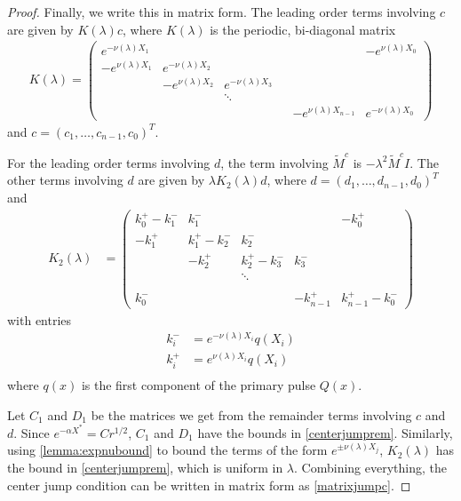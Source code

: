 \documentclass[thesis.tex]{subfiles}
\begin{document}
\begin{lemma}
\begin{proof}
Finally, we write this in matrix form. The leading order terms involving $c$ are given by $K(\lambda)c$, where $K(\lambda)$ is the periodic, bi-diagonal matrix
\begin{align*}
K(\lambda) =  
\begin{pmatrix}
e^{-\nu(\lambda)X_1} & & & & & -e^{\nu(\lambda)X_0} \\
-e^{\nu(\lambda)X_1} & e^{-\nu(\lambda)X_2} \\
& -e^{\nu(\lambda)X_2} & e^{-\nu(\lambda)X_3} \\
  & & \ddots & && \\
& & & & -e^{\nu(\lambda)X_{n-1}} & e^{-\nu(\lambda)X_0}
\end{pmatrix}
\end{align*}
and $c = (c_1, \dots, c_{n-1}, c_0)^T$.

For the leading order terms involving $d$, the term involving $\tilde{M}^c$ is $-\lambda^2 \tilde{M}^c I$. The other terms involving $d$ are given by $\lambda K_2(\lambda) d$, where $d = (d_1, \dots, d_{n-1}, d_0)^T$ and 
\begin{align*}
K_2(\lambda) &= \begin{pmatrix}
k_0^+ - k_1^- & k_1^- &&& -k_0^+ \\
-k_1^+ & k_1^+ - k_2^- & k_2^- \\
& -k_2^+ & k_2^+ - k_3^- & k_3^- \\ && \ddots \\
\\
k_0^- &&& -k_{n-1}^+ & k_{n-1}^+ - k_0^- 
\end{pmatrix}
\end{align*}
with entries
\begin{align*}
k_i^- &= e^{-\nu(\lambda)X_i} q(X_i)\\
k_i^+ &= e^{\nu(\lambda)X_i} q(X_i)\\
\end{align*}
where $q(x)$ is the first component of the primary pulse $Q(x)$.

Let $C_1$ and $D_1$ be the matrices we get from the remainder terms involving $c$ and $d$. Since $e^{-\alpha X^*} = C r^{1/2}$, $C_1$ and $D_1$ have the bounds in \cref{centerjumprem}. Similarly, using \cref{lemma:expnubound} to bound the terms of the form $e^{\pm \nu(\lambda)X_j}$, $K_2(\lambda)$ has the bound in \cref{centerjumprem}, which is uniform in $\lambda$. Combining everything, the center jump condition can be written in matrix form as \cref{matrixjumpc}.
\end{proof}
\end{lemma}
\end{document}
